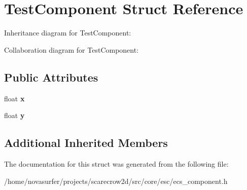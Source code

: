 \hypertarget{structTestComponent}{}\section{Test\+Component Struct Reference}
\label{structTestComponent}


Inheritance diagram for Test\+Component\+:


Collaboration diagram for Test\+Component\+:
\subsection*{Public Attributes}
\begin{DoxyCompactItemize}
\item 
\mbox{\label{structTestComponent_a89cab128ebdf0c3ac0382dbe77f0051a}} 
float {\bfseries x}
\item 
\mbox{\label{structTestComponent_a0af7d6c9a73690ec23135af2e0c8ec06}} 
float {\bfseries y}
\end{DoxyCompactItemize}
\subsection*{Additional Inherited Members}


The documentation for this struct was generated from the following file\+:\begin{DoxyCompactItemize}
\item 
/home/novasurfer/projects/scarecrow2d/src/core/esc/ecs\+\_\+component.\+h\end{DoxyCompactItemize}
